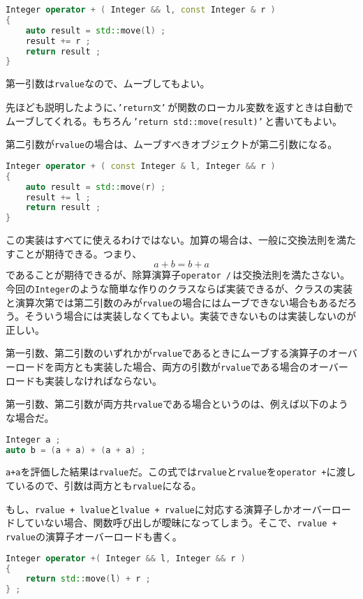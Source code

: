 \begin{lstlisting}[language={C++}]
Integer operator + ( Integer && l, const Integer & r )
{
    auto result = std::move(l) ;
    result += r ;
    return result ;    
}
\end{lstlisting}

第一引数は\texttt{rvalue}なので、ムーブしてもよい。

先ほども説明したように、\texttt{'return文'}\,が関数のローカル変数を返すときは自動でムーブしてくれる。もちろん\,\texttt{'return std::move(result)'}\,と書いてもよい。

第二引数が\texttt{rvalue}の場合は、ムーブすべきオブジェクトが第二引数になる。

\begin{lstlisting}[language={C++}]
Integer operator + ( const Integer & l, Integer && r )
{
    auto result = std::move(r) ;
    result += l ;
    return result ;    
}
\end{lstlisting}

この実装はすべてに使えるわけではない。加算の場合は、一般に交換法則を満たすことが期待できる。つまり、
\[ a + b = b + a \]
であることが期待できるが、除算演算子\texttt{operator /}\,は交換法則を満たさない。今回の\texttt{Integer}のような簡単な作りのクラスならば実装できるが、クラスの実装と演算次第では第二引数のみが\texttt{rvalue}の場合にはムーブできない場合もあるだろう。そういう場合には実装しなくてもよい。実装できないものは実装しないのが正しい。

第一引数、第二引数のいずれかが\texttt{rvalue}であるときにムーブする演算子のオーバーロードを両方とも実装した場合、両方の引数が\texttt{rvalue}である場合のオーバーロードも実装しなければならない。

第一引数、第二引数が両方共\texttt{rvalue}である場合というのは、例えば以下のような場合だ。

\begin{lstlisting}[language={C++}]
Integer a ;
auto b = (a + a) + (a + a) ;
\end{lstlisting}

\texttt{a+a}を評価した結果は\texttt{rvalue}だ。この式では\texttt{rvalue}と\texttt{rvalue}を\texttt{operator +}に渡しているので、引数は両方とも\texttt{rvalue}になる。

もし、\texttt{rvalue + lvalue}と\texttt{lvalue + rvalue}に対応する演算子しかオーバーロードしていない場合、関数呼び出しが曖昧になってしまう。そこで、\texttt{rvalue + rvalue}の演算子オーバーロードも書く。

\ifTombow\pagebreak\fi
\begin{lstlisting}[language={C++}]
Integer operator +( Integer && l, Integer && r )
{
    return std::move(l) + r ;
} ;
\end{lstlisting}

